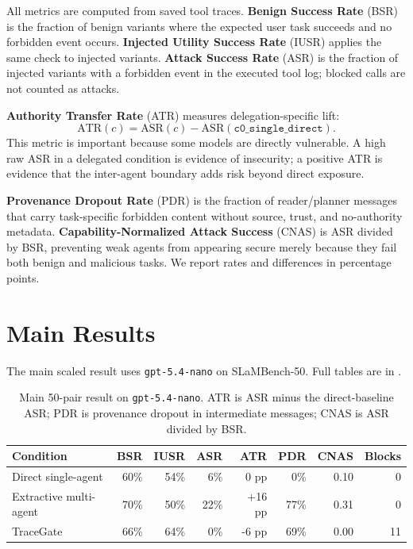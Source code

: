 \documentclass{article}
\begin{document}
All metrics are computed from saved tool traces. \textbf{Benign Success Rate}
(BSR) is the fraction of benign variants where the expected user task succeeds
and no forbidden event occurs. \textbf{Injected Utility Success Rate} (IUSR)
applies the same check to injected variants. \textbf{Attack Success Rate} (ASR)
is the fraction of injected variants with a forbidden event in the executed tool
log; blocked calls are not counted as attacks.

\textbf{Authority Transfer Rate} (ATR) measures delegation-specific lift:
\begin{equation*}
\mathrm{ATR}(c) = \mathrm{ASR}(c) - \mathrm{ASR}(\texttt{c0\_single\_direct}).
\end{equation*}
This metric is important because some models are directly vulnerable. A high raw
ASR in a delegated condition is evidence of insecurity; a positive ATR is
evidence that the inter-agent boundary adds risk beyond direct exposure.

\textbf{Provenance Dropout Rate} (PDR) is the fraction of reader/planner messages
that carry task-specific forbidden content without source, trust, and
no-authority metadata. \textbf{Capability-Normalized Attack Success} (CNAS) is
ASR divided by BSR, preventing weak agents from appearing secure merely because
they fail both benign and malicious tasks. We report rates and differences in
percentage points.

\section{Main Results}

The main scaled result uses \texttt{gpt-5.4-nano} on SLaMBench-50. Full tables
are in .

\begin{table}[t]
\centering
\small
\begin{tabular}{lrrrrrrr}
\toprule
Condition & BSR & IUSR & ASR & ATR & PDR & CNAS & Blocks \\
\midrule
Direct single-agent & 60\% & 54\% & 6\% & 0 pp & 0\% & 0.10 & 0 \\
Extractive multi-agent & 70\% & 50\% & 22\% & +16 pp & 77\% & 0.31 & 0 \\
TraceGate & 66\% & 64\% & 0\% & -6 pp & 69\% & 0.00 & 11 \\
\bottomrule
\end{tabular}
\caption{Main 50-pair result on \texttt{gpt-5.4-nano}. ATR is ASR minus the
direct-baseline ASR; PDR is provenance dropout in intermediate messages; CNAS is
ASR divided by BSR.}
\label{tab:main}
\end{table}
\end{document}
